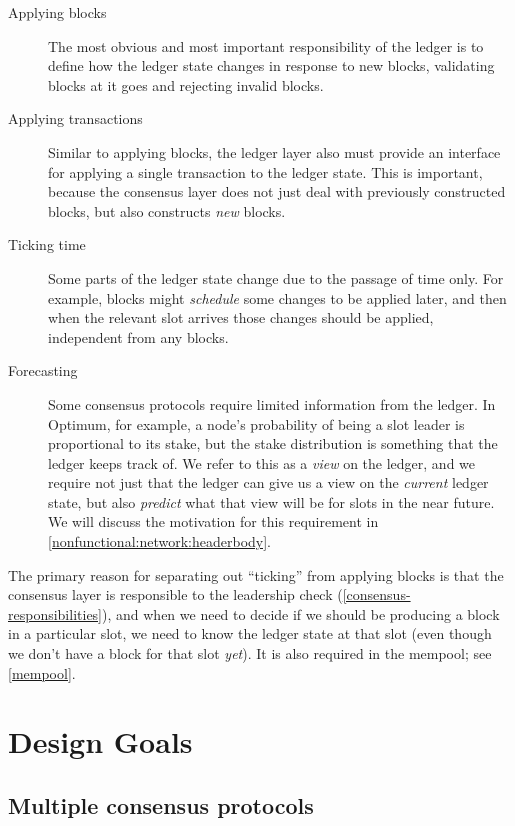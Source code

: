\begin{description}
\item[Applying blocks] The most obvious and most important responsibility of
the ledger is to define how the ledger state changes in response to new blocks,
validating blocks at it goes and rejecting invalid blocks.\

\item[Applying transactions] Similar to applying blocks, the ledger layer also
must provide an interface for applying a single transaction to the ledger state.
This is important, because the consensus layer does not just deal with
previously constructed blocks, but also constructs \emph{new} blocks.

\item[Ticking time] Some parts of the ledger state change due to the passage of
time only. For example, blocks might \emph{schedule} some changes to be applied
later, and then when the relevant slot arrives those changes should be applied,
independent from any blocks.

\item[Forecasting] Some consensus protocols require limited information from the
ledger. In Optimum, for example, a node's probability of being a slot leader is
proportional to its stake, but the stake distribution is something that the
ledger keeps track of. We refer to this as a \emph{view} on the ledger, and we
require not just that the ledger can give us a view on the \emph{current} ledger
state, but also \emph{predict} what that view will be for slots in the near
future. We will discuss the motivation for this requirement in
\cref{nonfunctional:network:headerbody}.
\end{description}

The primary reason for separating out ``ticking'' from applying blocks is that
the consensus layer is responsible to the leadership check
(\cref{consensus-responsibilities}), and when we need to decide if we should be
producing a block in a particular slot, we need to know the ledger state at that
slot (even though we don't have a block for that slot \emph{yet}). It is also
required in the mempool; see \cref{mempool}.

\section{Design Goals}

\subsection{Multiple consensus protocols}
\label{multiple-consensus-protocols}

